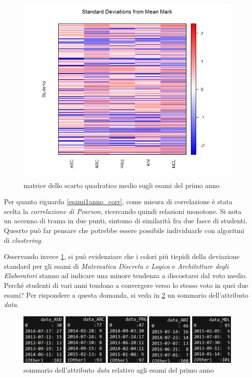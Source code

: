                 \begin{figure}
                    \centering
                    \caption{matrice dello scarto quadratico medio sugli esami del primo anno}
                    \label{esami1anno_stddev}
                	\includegraphics[scale=0.5]{img/std_dev_matrix_1.png}
                \end{figure}

                Per quanto riguarda \ref{esami1anno_corr}, come misura di correlazione è stata scelta la \textit{correlazione di Pearson}, ricercando quindi relazioni monotone. Si nota un accenno di trama in due punti, sintomo di similarità fra due fasce di studenti. Quesrto può far pensare che potrebbe essere possibile individuarle con algoritmi di \textit{clustering}.

                Osservando invece  \ref{esami1anno_stddev}, si può evidenziare che i colori più tiepidi della deviazione standard per gli esami di \textit{Matematica Discreta e Logica} e \textit{Architetture degli Elaboratori} stanno ad indicare una minore tendenza a discostarsi dal voto medio. Perché studenti di vari anni tendono a convergere verso lo stesso voto in quei due esami? Per rispondere a questa domanda, si veda in \ref{1annosommario} un sommario dell'attributo \textit{data}.

                \begin{figure}
                    \centering
                    \caption{sommario dell'attributo \textit{data} relativo agli esami del primo anno}
                    \label{1annosommario}
                	\includegraphics[scale=0.8]{img/sommario_1_anno.png}
                \end{figure}

